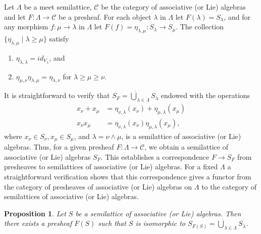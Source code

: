 \documentclass{amsart}
\newcommand{\0}{{\vartheta}}
\newtheorem{prop}[thm]{Proposition}
\theoremstyle{definition}
\theoremstyle{remark}
\numberwithin{equation}{section}
\newtheorem*{Theorem A}{\textbf{Theorem A}}
\newtheorem*{Corollary E}{\textbf{Corollary E}}
\newtheorem*{Corollary F}{\textbf{Corollary F}}
\newtheorem*{Theorem B}{\textbf{Theorem B}}
\newtheorem*{Theorem C}{\textbf{Theorem C}}
\newtheorem*{Theorem D}{\textbf{Theorem B}}
\newtheorem*{p a}{\textbf{Proof of  Theorem A}}
\newtheorem*{p b}{\textbf{Proof of Theorem B}}
\newtheorem*{p c}{\textbf{Proof of  Theorem C}}
\newtheorem*{p d}{\textbf{Proof of  Theorem D}}
\begin{document}
Let $\Lambda$ be a meet semilattice,  $\mathcal{C}$ be the  category of associative (or Lie)  algebras 
and let $F: \Lambda\to \mathcal{C}$ be a presheaf. For each object $\lambda$ in $\Lambda$ let $F(\lambda)=S_\lambda$, and for any morphism  $f:\mu\to \lambda$ in $\Lambda$ let $F(f)=\eta_{\lambda,\mu}: S_\lambda\to S_\mu$. The collection $\{\eta_{\lambda,\mu}\mid \lambda\geq \mu\}$ satisfy 
\begin{enumerate}
    \item $\eta_{\lambda,\lambda}=id_{V_{\lambda}}$, and
    \item $ \eta_{\mu,\nu} \eta_{\lambda,\mu}= \eta_{\lambda,\nu}$ for $\lambda \geq\mu \geq \nu$.
\end{enumerate}
It is straightforward to verify that 
$S_F=\dot{\bigcup}_{\lambda\in \Lambda} S_{\lambda}$ endowed with the operations
    \begin{align*}
      x_{\nu}+x_{\mu}&=\eta_{\nu,\lambda}(x_{\nu})+ \eta_{\mu,\lambda}(x_{\mu})\\
      x_{\nu}x_{\mu}&=\eta_{\nu,\lambda}(x_{\nu})\eta_{\mu,\lambda}(x_{\mu}),
         \end{align*}
where $x_\nu\in S_\nu, x_\mu\in S_\mu$, and $\lambda=\nu\wedge\mu$, is a semilattice of 
  associative (or Lie) algebras.  Thus, for a given presheaf $F:\Lambda\to \mathcal{C}$, we obtain a semilattice of associative (or Lie) algebras $S_F.$  This establishes a correspondence $F\to S_F$ from presheaves to  semilattices of associative (or Lie) algebras. For a fixed $\Lambda$ a straightforward verification shows that this correspondence gives a functor from the category of presheaves of associative (or Lie) algebras on  $\Lambda $  to the category of semilattices of associative (or Lie) algebras. 
    

\begin{prop}\label{prop-semila}
 Let $S$ be a semilattice of  associative (or Lie) algebras. Then there exists a presheaf $F(S)$ such that $S$ is isomorphic to $S_{F(S)}=\dot{\bigcup}_{\lambda\in \Lambda}  S_{\lambda}$. 
\end{prop}
\end{document}
